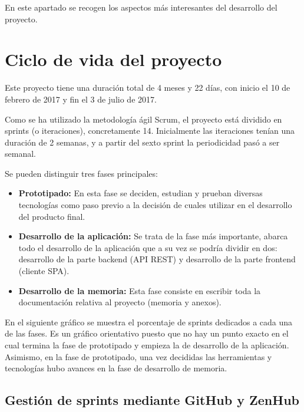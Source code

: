 
En este apartado se recogen los aspectos más interesantes del desarrollo del proyecto.

\section{Ciclo de vida del proyecto}

Este proyecto tiene una duración total de 4 meses y 22 días, con inicio el 10 de febrero de 2017 y fin el 3 de julio de 2017.

Como se ha utilizado la metodología ágil Scrum, el proyecto está dividido en sprints (o iteraciones), concretamente 14. Inicialmente las iteraciones tenían una duración de 2 semanas, y a partir del sexto sprint la periodicidad pasó a ser semanal.

Se pueden distinguir tres fases principales:

\begin{itemize}
\tightlist
	\item \textbf{Prototipado:} En esta fase se deciden, estudian y prueban diversas tecnologías como paso previo a la decisión de cuales utilizar en el desarrollo del producto final.
	\item \textbf{Desarrollo de la aplicación:} Se trata de la fase más importante, abarca todo el desarrollo de la aplicación que a su vez se podría dividir en dos: desarrollo de la parte backend (API REST) y desarrollo de la parte frontend (cliente SPA).
	\item \textbf{Desarrollo de la memoria:} Esta fase consiste en escribir toda la documentación relativa al proyecto (memoria y anexos).
\end{itemize}

En el siguiente gráfico se muestra el porcentaje de sprints dedicados a cada una de las fases. Es un gráfico orientativo puesto que no hay un punto exacto en el cual termina la fase de prototipado y empieza la de desarrollo de la aplicación. Asimismo, en la fase de prototipado, una vez decididas las herramientas y tecnologías hubo avances en la fase de desarrollo de memoria.


\subsection{Gestión de sprints mediante GitHub y ZenHub}

